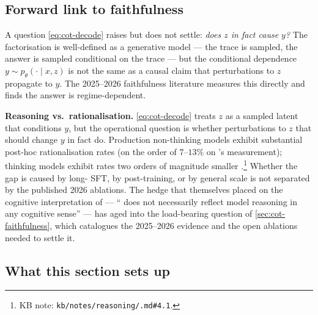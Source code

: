 \subsection{Forward link to faithfulness}
\label{sec:cot-faith-forward}

A question \cref{eq:cot-decode} raises but does not settle: \emph{does
$z$ in fact cause $y$?} The factorisation is well-defined as a
generative model — the trace is sampled, the answer is sampled
conditional on the trace — but the conditional dependence
$y \sim p_\theta(\cdot \mid x, z)$ is not the same as a causal claim
that perturbations to $z$ propagate to $y$. The 2025--2026 faithfulness
literature \citep{arcuschin2025-cot-wild,shen2025-faithcot-bench,
mehta2026-faithfulness-scaling} measures this directly and finds the
answer is regime-dependent.

\begin{contradiction}
\textbf{Reasoning vs.\ rationalisation.} \cref{eq:cot-decode} treats
$z$ as a sampled latent that conditions $y$, but the operational
question is whether perturbations to $z$ that should change $y$ in fact
do. Production non-thinking models exhibit substantial post-hoc
rationalisation rates (on the order of $7$--$13\%$ on
\citet{mehta2026-faithfulness-scaling}'s measurement); thinking models
exhibit rates two orders of magnitude smaller
\citep[\S 4]{mehta2026-faithfulness-scaling}.\footnote{KB note:
\texttt{kb/notes/reasoning/.md\#4.1}.} Whether the gap
is caused by long- SFT, by  post-training, or by general scale
is not separated by the published 2026 ablations. The hedge that
\citet[\S 6]{wei2022-cot} themselves placed on the cognitive
interpretation of  --- `` does not necessarily
reflect model reasoning in any cognitive sense'' --- has aged into the
load-bearing question of \cref{sec:cot-faithfulness}, which catalogues
the 2025--2026 evidence and the open ablations needed to settle it.
\end{contradiction}

\subsection{What this section sets up}
\label{sec:cot-forward}


